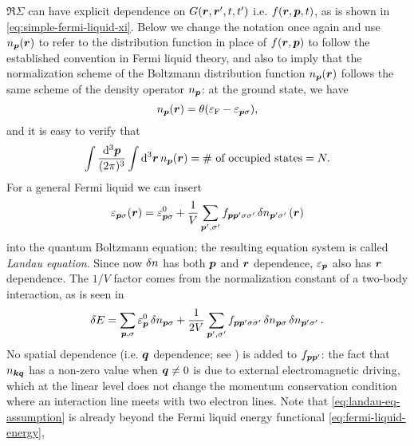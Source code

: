 \documentclass[hyperref, a4paper]{article}
\newcommand*{\term}[1]{\textit{#1}}
\newcommand*{\efermi}{\varepsilon_{\text{F}}}
\begin{document}
$\Re \Sigma$ can have explicit dependence on $G(\vb*{r}, \vb*{r}', t, t')$
i.e. $f(\vb*{r}, \vb*{p}, t)$,
as is shown in \eqref{eq:simple-fermi-liquid-xi}.
Below we change the notation once again and use $n_{\vb*{p}}(\vb*{r})$ 
to refer to the distribution function in place of $f(\vb*{r}, \vb*{p})$
to follow the established convention in Fermi liquid theory,
and also to imply that 
the normalization scheme of the Boltzmann distribution function $n_{\vb*{p}}(\vb*{r})$
follows the same scheme of the density operator $n_{\vb*{p}}$:
at the ground state, we have 
\begin{equation}
    n_{\vb*{p}}(\vb*{r}) = \theta(\efermi - \varepsilon_{\vb*{p} \sigma}),
\end{equation}
and it is easy to verify that 
\begin{equation}
    \int \frac{\dd[3]{\vb*{p}}}{(2\pi)^3} \int \dd[3]{\vb*{r}} n_{\vb*{p}}(\vb*{r})  = 
    \text{\# of occupied states} = N.
\end{equation}
For a general Fermi liquid we can insert
\begin{equation}
    \varepsilon_{\vb*{p} \sigma}(\vb*{r}) = \varepsilon^0_{\vb*{p} \sigma} + 
    \frac{1}{V} \sum_{\vb*{p}', \sigma'} f_{\vb*{p} \vb*{p}' \sigma \sigma'} \var{n}_{\vb*{p}' \sigma'} (\vb*{r})
    \label{eq:landau-eq-assumption}
\end{equation}
into the quantum Boltzmann equation;
the resulting equation system is called \term{Landau equation}.
Since now $\var{n}$ has both $\vb*{p}$ and $\vb*{r}$ dependence,
$\varepsilon_{\vb*{p}}$ also has $\vb*{r}$ dependence.
The $1/V$ factor comes from the normalization constant 
of a two-body interaction, 
as is seen in 
\begin{equation}
    \var{E} = \sum_{\vb*{p}, \sigma} \varepsilon^0_{\vb*{p}} \var{n}_{\vb*{p} \sigma}
    + \frac{1}{2V} \sum_{\vb*{p}', \sigma'} f_{\vb*{p} \vb*{p}' \sigma \sigma'}
    \var{n}_{\vb*{p} \sigma} \var{n}_{\vb*{p}' \sigma'}.
    \label{eq:fermi-liquid-energy}
\end{equation}
No spatial dependence (i.e. $\vb*{q}$ dependence; see ) 
is added to $f_{\vb*{p} \vb*{p}'}$:
the fact that $n_{\vb*{k} \vb*{q}}$ has a non-zero value when $\vb*{q} \neq 0$
is due to external electromagnetic driving, 
which at the linear level does not change
the momentum conservation condition 
where an interaction line meets with two electron lines.
Note that \eqref{eq:landau-eq-assumption} is already beyond 
the Fermi liquid energy functional \eqref{eq:fermi-liquid-energy},
\end{document}
